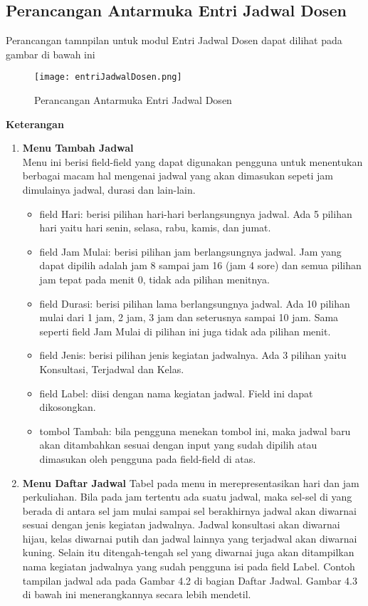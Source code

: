 \subsection{Perancangan Antarmuka Entri Jadwal Dosen}
Perancangan tamnpilan untuk modul Entri Jadwal Dosen dapat dilihat pada gambar di bawah ini
\begin{figure} [H]
	\centering  
	\texttt{[image: entriJadwalDosen.png]}
	\caption[Perancangan Antarmuka Entri Jadwal Dosen]{Perancangan Antarmuka Entri Jadwal Dosen} 
	\label{fig:flow-chart-CodeIgniter} 
\end{figure}
\textbf{Keterangan}
\begin{enumerate}
\item \textbf{Menu Tambah Jadwal}\\ Menu ini berisi field-field yang dapat digunakan pengguna untuk menentukan berbagai macam hal mengenai jadwal yang akan dimasukan sepeti jam dimulainya jadwal, durasi dan lain-lain.
	\begin{itemize}
		\item field Hari: berisi pilihan hari-hari berlangsungnya jadwal. Ada 5 pilihan hari yaitu hari senin, selasa, rabu, kamis, dan jumat.
		\item field Jam Mulai: berisi pilihan jam berlangsungnya jadwal. Jam yang dapat dipilih adalah jam 8 sampai jam 16 (jam 4 sore) dan semua 		pilihan jam tepat pada menit 0, tidak ada pilihan menitnya.
		\item field Durasi: berisi pilihan lama berlangsungnya jadwal. Ada 10 pilihan mulai dari 1 jam, 2 jam, 3 jam dan seterusnya sampai 10 			jam. Sama seperti field Jam Mulai di pilihan ini juga tidak ada pilihan menit.
		\item field Jenis: berisi pilihan jenis kegiatan jadwalnya. Ada 3 pilihan yaitu Konsultasi, Terjadwal dan Kelas.
		\item field Label: diisi dengan nama kegiatan jadwal. Field ini dapat dikosongkan.
		\item tombol Tambah: bila pengguna menekan tombol ini, maka jadwal baru akan ditambahkan sesuai dengan input yang sudah dipilih atau dimasukan oleh pengguna pada field-field di atas.
	\end{itemize}
\item \textbf{Menu Daftar Jadwal} \newline
Tabel pada menu in merepresentasikan hari dan jam perkuliahan. Bila pada jam tertentu ada suatu jadwal, maka sel-sel di yang berada di antara sel jam mulai sampai sel berakhirnya jadwal akan diwarnai sesuai dengan jenis kegiatan jadwalnya. Jadwal konsultasi akan diwarnai hijau, kelas diwarnai putih dan jadwal lainnya yang terjadwal akan diwarnai kuning. Selain itu ditengah-tengah sel yang diwarnai juga akan ditampilkan nama kegiatan jadwalnya yang sudah pengguna isi pada field Label. Contoh tampilan jadwal ada pada Gambar 4.2 di bagian Daftar Jadwal. Gambar 4.3 di bawah ini menerangkannya secara lebih mendetil.

\end{enumerate}
